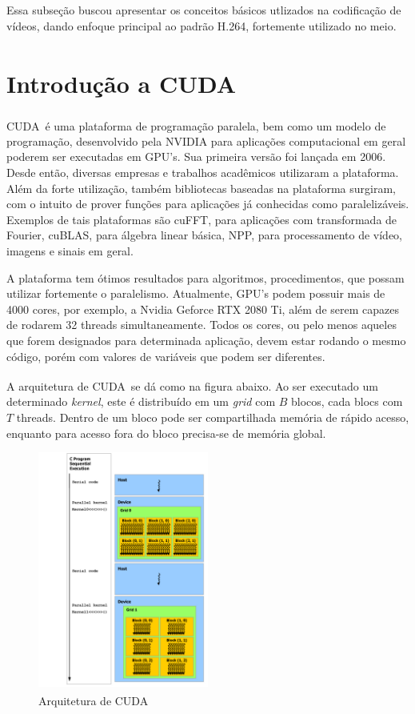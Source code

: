 \documentclass[cic,tc]{iiufrgs}
\newcommand{\reg}{\textsuperscript{\textregistered}}
\begin{document}
Essa subseção buscou apresentar os conceitos básicos utlizados na codificação de vídeos, 
dando enfoque principal ao padrão H.264, fortemente utilizado no meio.

\section{Introdução a CUDA\reg}
CUDA\reg~é uma plataforma de programação paralela, bem como um modelo de programação, 
desenvolvido pela NVIDIA para aplicações computacional em geral poderem ser executadas
em GPU's.
Sua primeira versão foi lançada em 2006.
Desde então, diversas empresas e trabalhos acadêmicos utilizaram a plataforma.
Além da forte utilização, também bibliotecas baseadas na plataforma surgiram, 
com o intuito de prover funções para aplicações já conhecidas como paralelizáveis.
Exemplos de tais plataformas são cuFFT, para aplicações com transformada de Fourier,
cuBLAS, para álgebra linear básica, NPP, para processamento de vídeo, imagens e 
sinais em geral.

A plataforma tem ótimos resultados para algoritmos, procedimentos, que possam utilizar
fortemente o paralelismo.
Atualmente, GPU's podem possuir mais de 4000 cores, por exemplo, a Nvidia Geforce RTX 2080 Ti,
além de serem capazes de rodarem 32 threads simultaneamente.
Todos os cores, ou pelo menos aqueles que forem designados para determinada aplicação,
devem estar rodando o mesmo código, porém com valores de variáveis que podem ser diferentes.

A arquitetura de CUDA\reg~se dá como na figura abaixo.
Ao ser executado um determinado \textit{kernel}, este é distribuído em um \textit{grid}
com $B$ blocos, cada blocs com $T$ threads.
Dentro de um bloco pode ser compartilhada memória de rápido acesso, enquanto para 
acesso fora do bloco precisa-se de memória global.
\begin{figure}[H]
    \caption{Arquitetura de CUDA\reg}
    \begin{center}
        \includegraphics[width=0.5\textwidth]{img/CUDAarch.png}
    \end{center}
\end{figure}
\end{document}
